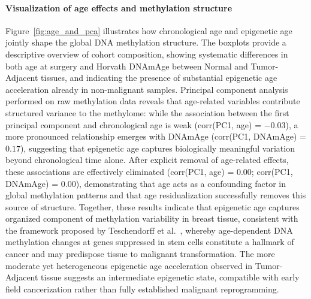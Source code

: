 \documentclass[10pt]{extarticle}
\begin{document}
\paragraph{Visualization of age effects and methylation structure}
Figure~\ref{fig:age_and_pca} illustrates how chronological age and epigenetic age jointly shape the global DNA methylation structure. 
The boxplots provide a descriptive overview of cohort composition, showing systematic differences in both age at surgery and Horvath DNAmAge between Normal and Tumor-Adjacent tissues, and indicating the presence of substantial epigenetic age acceleration already in non-malignant samples.
Principal component analysis performed on raw methylation data reveals that age-related variables contribute structured variance to the methylome: while the association between the first principal component and chronological age is weak (corr(PC1, age) = $-0.03$), a more pronounced relationship emerges with DNAmAge (corr(PC1, DNAmAge) = $0.17$), suggesting that epigenetic age captures biologically meaningful variation beyond chronological time alone.
After explicit removal of age-related effects, these associations are effectively eliminated (corr(PC1, age) = $0.00$; corr(PC1, DNAmAge) = $0.00$), demonstrating that age acts as a confounding factor in global methylation patterns and that age residualization successfully removes this source of structure.
Together, these results indicate that epigenetic age captures organized component of methylation variability in breast tissue, consistent with the framework proposed by Teschendorff et al.~\cite{Teschendorff2010}, whereby age-dependent DNA methylation changes at genes suppressed in stem cells constitute a hallmark of cancer and may predispose tissue to malignant transformation.
The more moderate yet heterogeneous epigenetic age acceleration observed in Tumor-Adjacent tissue suggests an intermediate epigenetic state, compatible with early field cancerization rather than fully established malignant reprogramming.
\end{document}

